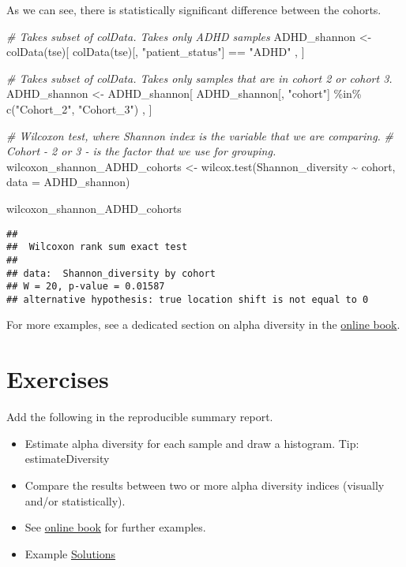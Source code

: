 \documentclass[
  oneside]{book}
\newenvironment{Shaded}{\begin{snugshade}}{\end{snugshade}}
\newcommand{\AttributeTok}[1]{\textcolor[rgb]{0.77,0.63,0.00}{#1}}
\newcommand{\CommentTok}[1]{\textcolor[rgb]{0.56,0.35,0.01}{\textit{#1}}}
\newcommand{\FunctionTok}[1]{\textcolor[rgb]{0.00,0.00,0.00}{#1}}
\newcommand{\NormalTok}[1]{#1}
\newcommand{\OtherTok}[1]{\textcolor[rgb]{0.56,0.35,0.01}{#1}}
\newcommand{\SpecialCharTok}[1]{\textcolor[rgb]{0.00,0.00,0.00}{#1}}
\newcommand{\StringTok}[1]{\textcolor[rgb]{0.31,0.60,0.02}{#1}}
\begin{document}
As we can see, there is statistically significant difference between the cohorts.

\begin{Shaded}
\begin{Highlighting}[]
\CommentTok{\# Takes subset of colData. Takes only ADHD samples}
\NormalTok{ADHD\_shannon }\OtherTok{\textless{}{-}} \FunctionTok{colData}\NormalTok{(tse)[ }\FunctionTok{colData}\NormalTok{(tse)[, }\StringTok{"patient\_status"}\NormalTok{] }\SpecialCharTok{==} \StringTok{"ADHD"}\NormalTok{ , ]}

\CommentTok{\# Takes subset of colData. Takes only samples that are in cohort 2 or cohort 3.}
\NormalTok{ADHD\_shannon }\OtherTok{\textless{}{-}}\NormalTok{ ADHD\_shannon[ ADHD\_shannon[, }\StringTok{"cohort"}\NormalTok{] }\SpecialCharTok{\%in\%} \FunctionTok{c}\NormalTok{(}\StringTok{"Cohort\_2"}\NormalTok{, }\StringTok{"Cohort\_3"}\NormalTok{) , ]}

\CommentTok{\# Wilcoxon test, where Shannon index is the variable that we are comparing. }
\CommentTok{\# Cohort {-} 2 or 3 {-} is the factor that we use for grouping. }
\NormalTok{wilcoxon\_shannon\_ADHD\_cohorts }\OtherTok{\textless{}{-}} \FunctionTok{wilcox.test}\NormalTok{(Shannon\_diversity }\SpecialCharTok{\textasciitilde{}}\NormalTok{ cohort, }\AttributeTok{data =}\NormalTok{ ADHD\_shannon)}

\NormalTok{wilcoxon\_shannon\_ADHD\_cohorts}
\end{Highlighting}
\end{Shaded}

\begin{verbatim}
## 
##  Wilcoxon rank sum exact test
## 
## data:  Shannon_diversity by cohort
## W = 20, p-value = 0.01587
## alternative hypothesis: true location shift is not equal to 0
\end{verbatim}

For more examples, see a dedicated section on alpha diversity in the
\href{https://microbiome.github.io/OMA/microbiome-diversity.html\#alpha-diversity}{online book}.

\hypertarget{exercises}{%
\section{Exercises}\label{exercises}}

Add the following in the reproducible summary report.

\begin{itemize}
\item
  Estimate alpha diversity for each sample and draw a histogram. Tip:
  estimateDiversity
\item
  Compare the results between two or more
  alpha diversity indices (visually and/or statistically).
\item
  See \href{https://microbiome.github.io/OMA/microbiome-diversity.html\#alpha-diversity}{online book}
  for further examples.
\item
  Example \href{07-3-ex-sol-ADHD.html}{Solutions}
\end{itemize}
\end{document}
